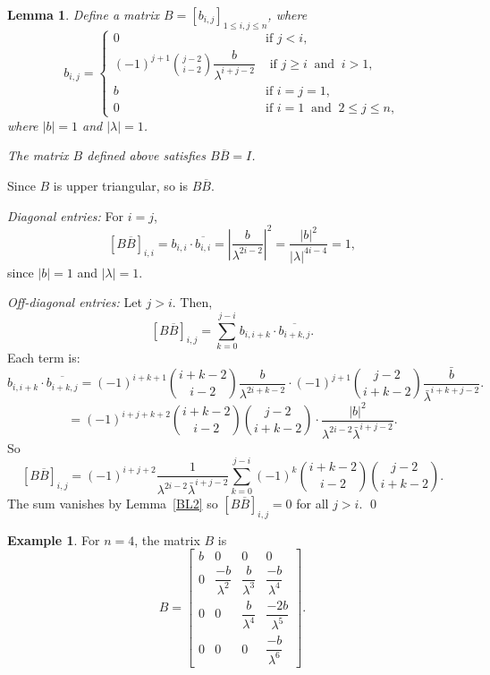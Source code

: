 \documentclass[11pt]{amsart}
\renewenvironment{proof}{{\bfseries Proof.}}{\qed}
\numberwithin{equation}{section}
\theoremstyle{plain}
\newtheorem{lemma}[theorem]{Lemma}
\theoremstyle{definition}
\newtheorem{Example}[theorem]{Example}
\newcommand{\lemref}[1]{Lemma~\ref{#1}}
\numberwithin{equation}{section}
\begin{document}
	


\begin{lemma}\label{c-B}
	Define a matrix $B = [b_{i,j}]_{1 \leq i,j \leq n}$, where
\[
b_{i,j} = 
\begin{cases} 
0 & \text{if } j < i, \\  
(-1)^{j+1} \binom{j-2}{i-2} \dfrac{b}{\lambda^{i+j-2}} & \text{ if } j \geq i ~\text{ and }~ i > 1, \\  
b & \text{if } i = j = 1, \\
0 & \text{if } i = 1 ~\text{ and }~ 2 \leq j \leq n,
\end{cases}
\]
where \( |b| = 1 \) and \( |\lambda| = 1 \).

The matrix $B$ defined above satisfies $B\overline{B} = I$.
\end{lemma}

\begin{proof}
Since $B$ is upper triangular, so is $B\overline{B}$.

\medskip
\noindent
\textit{Diagonal entries:} For $i = j$,
\[
[B\overline{B}]_{i,i} = b_{i,i} \cdot \overline{b_{i,i}} = \left| \frac{b}{\lambda^{2i-2}} \right|^2 = \frac{|b|^2}{|\lambda|^{4i - 4}} = 1,
\]
since $|b| = 1$ and $|\lambda| = 1$.

\medskip


\noindent
\textit{Off-diagonal entries:} Let $j > i$. Then,
\[
[B\overline{B}]_{i,j} = \sum_{k=0}^{j-i} b_{i,i+k} \cdot \overline{b_{i+k,j}}.
\]
Each term is:
\[
b_{i,i+k} \cdot \overline{b_{i+k,j}} = 
(-1)^{i+k+1} \binom{i+k-2}{i-2} \frac{b}{\lambda^{2i+k-2}} \cdot 
(-1)^{j+1} \binom{j-2}{i+k-2} \frac{\bar{b}}{\bar{\lambda}^{i+k+j-2}}.
\]
\[
= (-1)^{i+j+k+2} \binom{i+k-2}{i-2} \binom{j-2}{i+k-2} 
\cdot \frac{|b|^2}{\lambda^{2i-2} \bar{\lambda}^{i+j-2}}.
\]
So
\[
[B\overline{B}]_{i,j} = 
(-1)^{i+j+2} \frac{1}{\lambda^{2i-2} \bar{\lambda}^{i+j-2}} 
\sum_{k=0}^{j-i} (-1)^k \binom{i+k-2}{i-2} \binom{j-2}{i+k-2}.
\]
The sum vanishes by \lemref{BL2} so $[B\overline{B}]_{i,j} = 0$ for all $j > i$.
\end{proof}

\begin{Example}
For $n = 4$, the matrix $B$ is
\[
B =
\begin{bmatrix}
b & 0 & 0 & 0 \\
0 & \dfrac{-b}{\lambda^2} & \dfrac{b}{\lambda^3} & \dfrac{-b}{\lambda^4} \\
0 & 0 & \dfrac{b}{\lambda^4} & \dfrac{-2b}{\lambda^5} \\
0 & 0 & 0 & \dfrac{-b}{\lambda^6}
\end{bmatrix}.
\]
\end{Example}
\end{document}
